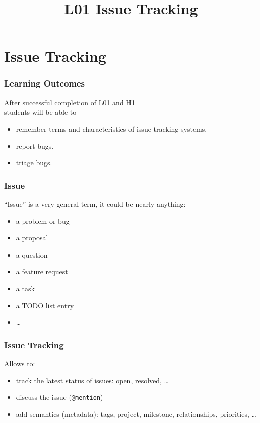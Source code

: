 

\title{L01 Issue Tracking}
\date{}



\section{Issue Tracking}

\begin{frame}
	\frametitle{Learning Outcomes}
	After successful completion of L01 and H1 \\
	students will be able to

	\begin{itemize}
	\item remember terms and characteristics of issue tracking systems.
	\item report bugs.
	\item triage bugs.
	\end{itemize}
\end{frame}

\begin{frame}
	\frametitle{Issue}

	``Issue'' is a very general term, it could be nearly anything:

	\begin{itemize}
		\item a problem or bug
		\item a proposal
		\item a question
		\item a feature request
		\item a task
		\item a TODO list entry
		\item \dots
	\end{itemize}
\end{frame}

\begin{frame}[fragile]
	\frametitle{Issue Tracking}

	Allows to:

	\begin{itemize}
		\item track the latest status of issues: open, resolved, \dots
		\item discuss the issue (\verb+@mention+)
		\item add semantics (metadata): tags, project, milestone, relationships, priorities, \dots
	\end{itemize}
\end{frame}

